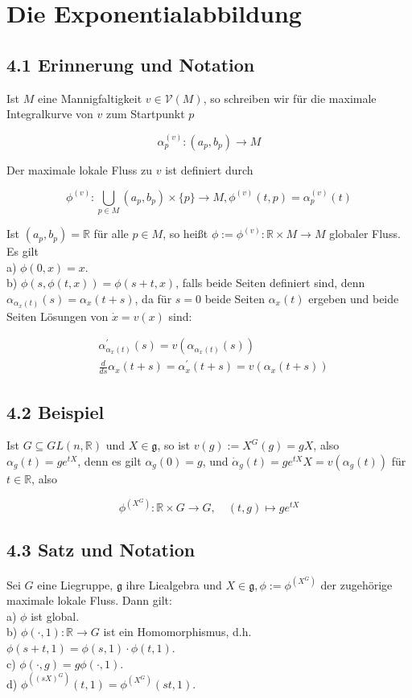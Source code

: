 \documentclass[10pt, letterpaper]{article}
\begin{document}
\pagebreak

\section{Die Exponentialabbildung}
\subsection*{4.1 Erinnerung und Notation}
Ist $M$ eine Mannigfaltigkeit $v \in \mathcal{V}(M)$, so schreiben wir für die maximale Integralkurve von $v$ zum Startpunkt $p$

$$
\alpha_{p}^{(v)}:\left(a_{p}, b_{p}\right) \rightarrow M
$$

Der maximale lokale Fluss zu $v$ ist definiert durch

$$
\phi^{(v)}: \bigcup_{p \in M}\left(a_{p}, b_{p}\right) \times\{p\} \rightarrow M, \phi^{(v)}(t, p)=\alpha_{p}^{(v)}(t)
$$

Ist $\left(a_{p}, b_{p}\right)=\mathbb{R}$ für alle $p \in M$, so heißt $\phi:=\phi^{(v)}: \mathbb{R} \times M \rightarrow M$ globaler Fluss. Es gilt\\
a) $\phi(0, x)=x$.\\
b) $\phi(s, \phi(t, x))=\phi(s+t, x)$, falls beide Seiten definiert sind, denn $\alpha_{\alpha_{x}(t)}(s)=\alpha_{x}(t+s)$, da für $s=0$ beide Seiten $\alpha_{x}(t)$ ergeben und beide Seiten Lösungen von $\dot{x}=v(x)$ sind:

$$
\begin{aligned}
& \alpha_{\alpha_{x}(t)}^{\prime}(s)=v\left(\alpha_{\alpha_{x}(t)}(s)\right) \\
& \frac{d}{d s} \alpha_{x}(t+s)=\alpha_{x}^{\prime}(t+s)=v\left(\alpha_{x}(t+s)\right)
\end{aligned}
$$

\subsection*{4.2 Beispiel}
Ist $G \subseteq G L(n, \mathbb{R})$ und $X \in \mathfrak{g}$, so ist $v(g):=X^{G}(g)=g X$, also $\alpha_{g}(t)=g e^{t X}$, denn es gilt $\alpha_{g}(0)=g$, und $\dot{\alpha}_{g}(t)=g e^{t X} X=v\left(\alpha_{g}(t)\right)$ für $t \in \mathbb{R}$, also

$$
\phi^{\left(X^{G}\right)}: \mathbb{R} \times G \rightarrow G, \quad(t, g) \mapsto g e^{t X}
$$

\subsection*{4.3 Satz und Notation}
Sei $G$ eine Liegruppe, $\mathfrak{g}$ ihre Liealgebra und $X \in \mathfrak{g}, \phi:=\phi^{\left(X^{G}\right)}$ der zugehörige maximale lokale Fluss. Dann gilt:\\
a) $\phi$ ist global.\\
b) $\phi(\cdot, 1): \mathbb{R} \rightarrow G$ ist ein Homomorphismus, d.h. $\phi(s+t, 1)=\phi(s, 1) \cdot \phi(t, 1)$.\\
c) $\phi(\cdot, g)=g \phi(\cdot, 1)$.\\
d) $\phi^{\left((s X)^{G}\right)}(t, 1)=\phi^{\left(X^{G}\right)}(s t, 1)$.
\end{document}
